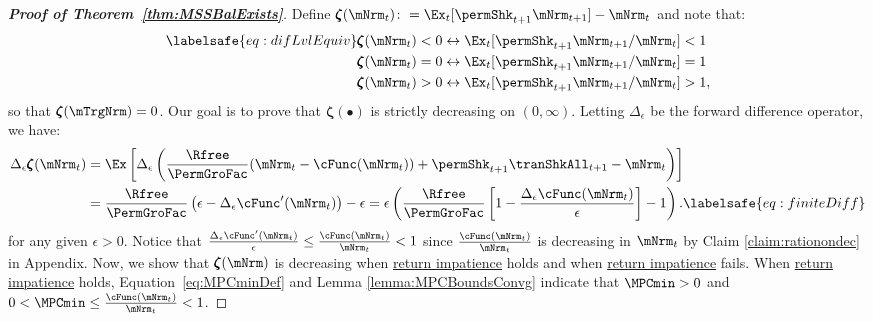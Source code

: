 \documentclass[\econtexRoot/BufferStockTheory]{subfiles}
\begin{document}
\begin{proof}[\textbf{Proof of Theorem~\ref{thm:MSSBalExists}}]

Define \providecommand{\difFunc}{\pmb{\zeta}} $\difFunc(\mNrm_t) \colon = 
\Ex_t[\permShk_{t+1}\mNrm_{t+1}] - \mNrm_t$ and note that:
\begin{align}\labelsafe{eq:difLvlEquiv}
  \difFunc(\mNrm_t) < 0 &\leftrightarrow \Ex_t[\permShk_{t+1}\mNrm_{t+1}/\mNrm_{t}] < 1 
                          \nonumber\\
  \difFunc(\mNrm_t) = 0 &\leftrightarrow \Ex_t[\permShk_{t+1}\mNrm_{t+1}/\mNrm_{t}] = 1\\
  \difFunc(\mNrm_t) > 0 &\leftrightarrow \Ex_t[\permShk_{t+1}\mNrm_{t+1}/\mNrm_{t}] > 
                          1,\nonumber
\end{align}
so that $\difFunc(\mTrgNrm)=0$.
Our goal is to prove that $\difFunc(\bullet)$ is strictly 
decreasing on $(0,\infty)$.
Letting $\Delta_{\epsilon}$ be the forward difference operator, we have:
%
\begin{align}
  \Delta_{\epsilon}\difFunc(\mNrm_{t}) & 			= \Ex\left[
                                                                                              \Delta_{\epsilon} \left( 
                                                                                               \frac{\Rfree}{\PermGroFac}(\mNrm_{t}-\cFunc(\mNrm_{t}))+%
                                                                                               {\permShk}_{t+1}{\tranShkAll}_{t+1} - {\mNrm}_t\right) \right] \notag \\
                                                                                             & = \frac{\Rfree}{\PermGroFac}\left( \epsilon-
                                                       \Delta_{\epsilon}\cFunc^{\prime}({\mNrm}_t)\right) - \epsilon = \epsilon\left(  \frac{\Rfree}{\PermGroFac}\left[1-
                                                       \frac{\Delta_{\epsilon}\cFunc({\mNrm}_t)}{\epsilon}\right]- 1\right). \labelsafe{eq:finiteDiff}
\end{align}
%
for any given $\epsilon>0$.
Notice  that $\frac{\Delta_{\epsilon}\cFunc^{\prime}({\mNrm}_t)}{\epsilon} \leq \frac{\cFunc(\mNrm_{t})}{\mNrm_{t}}<1$ since $\frac{\cFunc(\mNrm_{t})}{\mNrm_{t}}$ is decreasing in $\mNrm_{t}$ by Claim \ref{claim:rationondec} in Appendix.
Now, we show that $\difFunc(\mNrm)$ is decreasing when \hyperlink{RIC}{return impatience} holds and when \hyperlink{RIC}{return impatience} fails.
When \hyperlink{RIC}{return impatience} holds,  Equation~\eqref{eq:MPCminDef} and Lemma \ref{lemma:MPCBoundsConvg} indicate that $\MPCmin >0$ and $0 < \MPCmin \leq \frac{\cFunc(\mNrm_{t})}{\mNrm_{t}} < 1$.

\end{proof}
\end{document}
